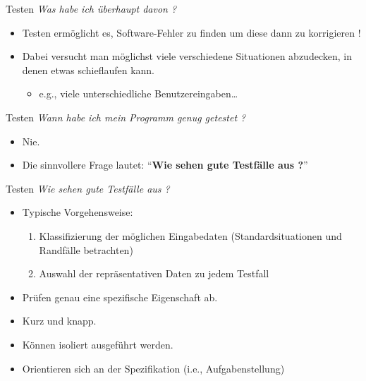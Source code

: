 \documentclass[18pt]{beamer}
\newcommand{\quotes}[1]{``#1''}
\begin{document}
\begin{frame}{Testen}
    \textit{Was habe ich überhaupt davon ?}
    \begin{itemize}
        \item Testen ermöglicht es, Software-Fehler zu finden um diese dann zu korrigieren !
        \item Dabei versucht man möglichst viele verschiedene Situationen abzudecken, in denen etwas schieflaufen kann.
        \begin{itemize}
            \item e.g., viele unterschiedliche Benutzereingaben\dots
        \end{itemize}
    \end{itemize}
\end{frame}

\begin{frame}{Testen}
    \textit{Wann habe ich mein Programm genug getestet ?}
    \pause
    \begin{itemize}
        \item Nie.
        \pause
        \item Die sinnvollere Frage lautet: \quotes{\textbf{Wie sehen gute Testfälle aus ?}}
    \end{itemize}
\end{frame}

\begin{frame}{Testen}
    \textit{Wie sehen gute Testfälle aus ?}
    \pause
    \begin{itemize}
        \item Typische Vorgehensweise:
        \begin{enumerate}
            \item Klassifizierung der möglichen Eingabedaten (Standardsituationen und Randfälle betrachten)
            \item Auswahl der repräsentativen Daten zu jedem Testfall
        \end{enumerate}

        \item Prüfen genau eine spezifische Eigenschaft ab.
        \item Kurz und knapp.
        \item Können isoliert ausgeführt werden.
        \item Orientieren sich an der Spezifikation (i.e., Aufgabenstellung)
    \end{itemize}
\end{frame}
\end{document}
